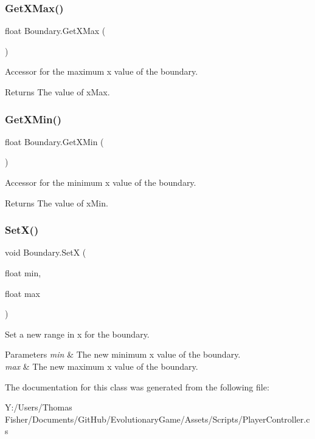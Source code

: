 \subsubsection{\texorpdfstring{Get\+X\+Max()}{GetXMax()}}
{\footnotesize\ttfamily float Boundary.\+Get\+X\+Max (\begin{DoxyParamCaption}{ }\end{DoxyParamCaption})}



Accessor for the maximum x value of the boundary. 

\begin{DoxyReturn}{Returns}
The value of x\+Max.
\end{DoxyReturn}
\mbox{\label{class_boundary_aad22a17a16d35571a86617ec1463a835}} 
\subsubsection{\texorpdfstring{Get\+X\+Min()}{GetXMin()}}
{\footnotesize\ttfamily float Boundary.\+Get\+X\+Min (\begin{DoxyParamCaption}{ }\end{DoxyParamCaption})}



Accessor for the minimum x value of the boundary. 

\begin{DoxyReturn}{Returns}
The value of x\+Min.
\end{DoxyReturn}
\mbox{\label{class_boundary_a5f3b05328e51a92d0fa7ddc5556b6c33}} 
\subsubsection{\texorpdfstring{Set\+X()}{SetX()}}
{\footnotesize\ttfamily void Boundary.\+SetX (\begin{DoxyParamCaption}\item[{float}]{min,  }\item[{float}]{max }\end{DoxyParamCaption})}



Set a new range in x for the boundary. 


\begin{DoxyParams}{Parameters}
{\em min} & The new minimum x value of the boundary.\\
\hline
{\em max} & The new maximum x value of the boundary.\\
\hline
\end{DoxyParams}


The documentation for this class was generated from the following file\+:\begin{DoxyCompactItemize}
\item 
Y\+:/\+Users/\+Thomas Fisher/\+Documents/\+Git\+Hub/\+Evolutionary\+Game/\+Assets/\+Scripts/Player\+Controller.\+cs\end{DoxyCompactItemize}
